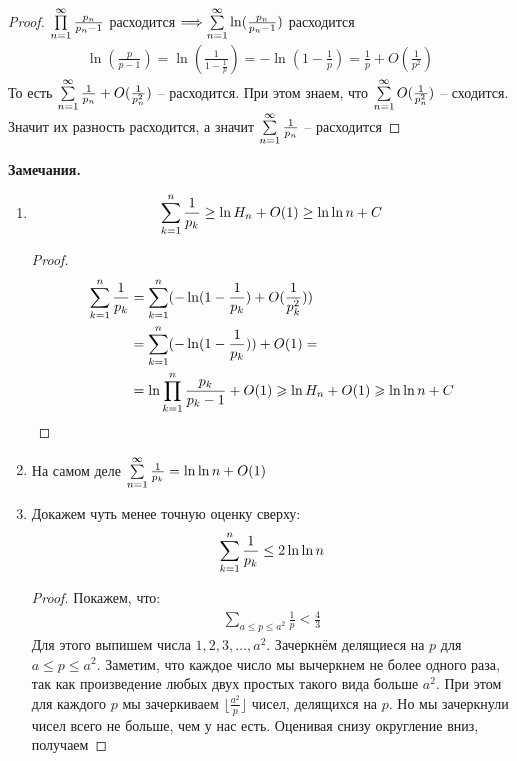\begin{proof}
    $\prod \limits_{n=1}^\infty \frac{p_n}{p_n - 1}$ расходится $\Longrightarrow \sum \limits_{n=1}^\infty \ln(\frac{p_n}{p_n-1})$ расходится
    \begin{gather*}
        \ln(\frac{p}{p-1}) = \ln(\frac{1}{1-\frac{1}{p}}) = -\ln(1 - \frac{1}{p}) = \frac{1}{p} + O(\frac{1}{p^2})
    \end{gather*}
    То есть $\sum \limits_{n=1}^\infty \frac{1}{p_n} + O(\frac{1}{p_n^2})$ -- расходится. При этом знаем, что $\sum \limits_{n=1}^\infty O(\frac{1}{p_n^2})$ -- сходится.
    Значит их разность расходится, а значит $\sum \limits_{n=1}^\infty \frac{1}{p_n}$ -- расходится
\end{proof}

\textbf{Замечания.} 
\begin{enumerate}
    \item \begin{gather*}
        \sum \limits_{k=1}^n \frac{1}{p_k} \geq \ln H_n + O(1) \geq \ln \ln n + C
    \end{gather*}
    \begin{proof}
        \begin{align*}
            \sum \limits_{k=1}^n \frac{1}{p_k} &= \sum \limits_{k=1}^n (-\ln(1-\frac{1}{p_k}) + O(\frac{1}{p_k^2})) \\
            &= \sum \limits_{k=1}^n (-\ln(1-\frac{1}{p_k})) + O(1) = \\
            &= \ln \prod \limits_{k=1}^n \frac{p_k}{p_k-1} + O(1) \geqslant \ln H_n + O(1) \geqslant \ln \ln n + C
        \end{align*}
    \end{proof}
    \item На самом деле $\sum \limits_{n=1}^\infty \frac{1}{p_k} = \ln \ln n + O(1)$
    \item Докажем чуть менее точную оценку сверху:
    \begin{gather*}
        \sum \limits_{k=1}^n \frac{1}{p_k} \leq 2\ln \ln n
    \end{gather*}
    \begin{proof}
        Покажем, что:
        \begin{gather*}
            \sum \limits_{a \leq p \leq a^2} \frac{1}{p} < \frac{4}{3}
        \end{gather*}
        Для этого выпишем числа $1, 2, 3, \ldots, a^2$. Зачеркнём делящиеся на $p$ для $a \leq p \leq a^2$.
        Заметим, что каждое число мы вычеркнем не более одного раза, так как произведение любых двух простых
        такого вида больше $a^2$. При этом для каждого $p$ мы зачеркиваем $\lfloor \frac{a^2}{p} \rfloor$ чисел, делящихся на $p$.
        Но мы зачеркнули чисел всего не больше, чем у нас есть. Оценивая снизу округление вниз, получаем


\end{proof}
\end{enumerate}
